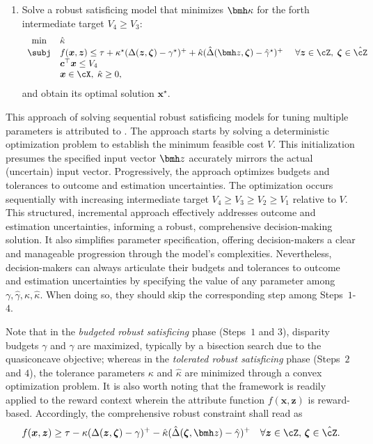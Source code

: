 \documentclass[mnsc, nonblindrev]{informswp}
\newcommand{\1}[1]{\mathds{1}{\left(#1\right)}}
\begin{document}
\begin{enumerate}[Step 1.]
\item Solve a robust satisficing model that minimizes $\bmh \kappa$ for the forth intermediate target $V_{4} \geq V_{3}$: 
\[
\begin{array}{cll} 
\min & \hat \kappa \\
{\subj} &  f(\bm x,\bm z) \leq \tau +  \kappa^\star (\Delta(\bm z,\bm \zeta) - \gamma^\star)^+ + \hat \kappa (\hat \Delta(\bmh z,\bm \zeta) - \hat \gamma^\star)^+  &~\forall \bm z \in \cZ, \; \bm \zeta \in \hat \cZ \\
& \bm c^\top \bm x \leq V_{4} \\
& \bm x \in \cX, \; \hat \kappa \geq 0,
\end{array}
\]
and obtain its optimal solution $\bm x^\star$. 
\end{enumerate} 

This approach of solving sequential robust satisficing models for tuning multiple parameters is attributed to \cite{sim2024analytics}. The approach 
starts by solving a deterministic optimization problem to establish the minimum feasible cost $V$. This initialization presumes the specified input vector $\bmh z$ accurately mirrors the actual (uncertain) input vector.
Progressively, the approach optimizes budgets and tolerances to outcome and estimation uncertainties. The optimization occurs sequentially with increasing intermediate target $V_{4} \geq V_{3} \geq V_{2} \geq V_{1}$ relative to $V$. This structured, incremental approach effectively addresses outcome and estimation uncertainties, informing a robust, comprehensive decision-making solution. It also simplifies parameter specification, offering decision-makers a clear and manageable progression through the model's complexities. Nevertheless, decision-makers can always articulate their budgets and tolerances to outcome and estimation uncertainties by specifying the value of any parameter among $\gamma, \hat \gamma, \kappa, \hat \kappa$. When doing so, they should skip the corresponding step among Steps~$1$-$4$.

Note that in the \textit{budgeted robust satisficing} phase (Steps~$1$ and $3$), disparity budgets $\gamma$ and $\hat \gamma$ are maximized, typically by a bisection search due to the quasiconcave objective; whereas in the \textit{tolerated robust satisficing} phase (Steps~$2$ and $4$), the tolerance parameters $\kappa$ and $\hat \kappa$ are minimized through a convex optimization problem. It is also worth noting that the framework is readily applied to the reward context wherein the attribute function $f(\bm x, \bm z)$ is reward-based. Accordingly, the comprehensive robust constraint shall read as
\[
f(\bm x,\bm z) \geq \tau - \kappa (\Delta(\bm z,\bm \zeta) - \gamma)^+ - \hat \kappa (\hat \Delta(\bm \zeta,\bmh z) - \hat \gamma)^+ ~~~\forall \bm z \in \cZ , \, \bm \zeta \in \hat \cZ.
\]
\end{document}
